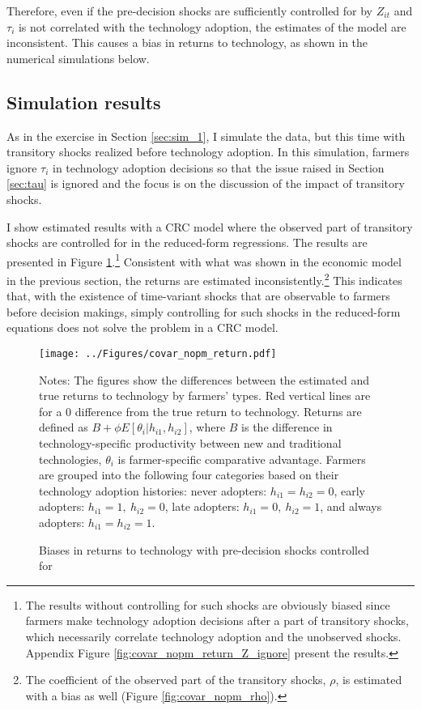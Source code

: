 \documentclass[11pt,letterpaper]{article}
\begin{document}
Therefore, even if the pre-decision shocks are sufficiently controlled for by $Z_{it}$ and $\tau_i$ is not correlated with the technology adoption, the estimates of the model are inconsistent.
This causes a bias in returns to technology, as shown in the numerical simulations below.

\subsection{Simulation results}

As in the exercise in Section \ref{sec:sim_1}, I simulate the data, but this time with transitory shocks realized before technology adoption.
In this simulation, farmers ignore $\tau_i$ in technology adoption decisions so that the issue raised in Section \ref{sec:tau} is ignored and the focus is on the discussion of the impact of transitory shocks.

I show estimated results with a CRC model where the observed part of transitory shocks are controlled for in the reduced-form regressions.
The results are presented in Figure \ref{fig:covar_nopm_return}.\footnote{
  The results without controlling for such shocks are obviously biased since farmers make technology adoption decisions after a part of transitory shocks, which necessarily correlate technology adoption and the unobserved shocks. 
  Appendix Figure \ref{fig:covar_nopm_return_Z_ignore} present the results.
}
Consistent with what was shown in the economic model in the previous section, the returns are estimated inconsistently.\footnote{
  The coefficient of the observed part of the transitory shocks, $\rho$, is estimated with a bias as well (Figure \ref{fig:covar_nopm_rho}).
}
This indicates that, with the existence of time-variant shocks that are observable to farmers before decision makings, simply controlling for such shocks in the reduced-form equations does not solve the problem in a CRC model.

\begin{figure}[H]
  \centering
  \caption{Biases in returns to technology with pre-decision shocks controlled for}
  \texttt{[image: ../Figures/covar\_nopm\_return.pdf]}
  \label{fig:covar_nopm_return}
  \footnotesize
  \begin{tablenotes}
    \item Notes:
      The figures show the differences between the estimated and true returns to technology by farmers' types.
      Red vertical lines are for a 0 difference from the true return to technology.
      Returns are defined as $B + \phi E[\theta_i | h_{i1}, h_{i2}]$, where $B$ is the difference in technology-specific productivity between new and traditional technologies, $\theta_i$ is farmer-specific comparative advantage.
      Farmers are grouped into the following four categories based on their technology adoption histories:
      never adopters: $h_{i1} = h_{i2} = 0$, 
      early adopters: $h_{i1} = 1, \ h_{i2} = 0$, 
      late adopters: $h_{i1} = 0, \ h_{i2} = 1$, and
      always adopters: $h_{i1} = h_{i2} = 1$.
  \end{tablenotes}
\end{figure}
\end{document}
